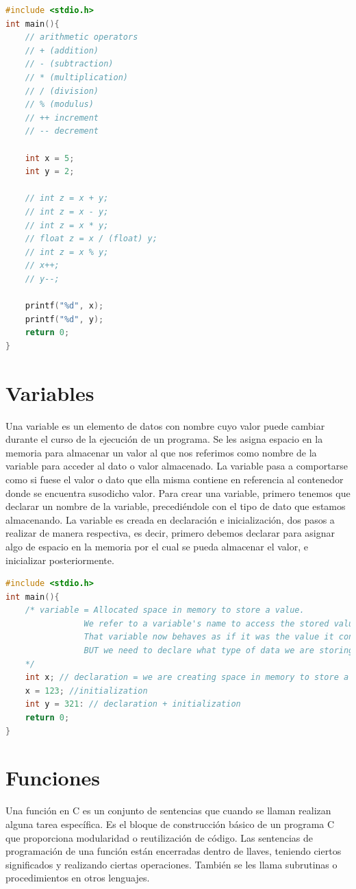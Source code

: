 \documentclass{article}
\begin{document}
\begin{lstlisting}[style=mystyle, language=C]
#include <stdio.h>
int main(){
	// arithmetic operators
	// + (addition)
	// - (subtraction)
	// * (multiplication)
	// / (division)
	// % (modulus)
	// ++ increment
	// -- decrement
	
	int x = 5;
	int y = 2;
	
	// int z = x + y;
	// int z = x - y;
	// int z = x * y;
	// float z = x / (float) y;
	// int z = x % y;
	// x++;
	// y--;
	
	printf("%d", x);
	printf("%d", y);
	return 0;
}
\end{lstlisting}
\section{Variables}
Una variable es un elemento de datos con nombre cuyo valor puede cambiar durante el curso de la ejecución de un programa. Se les asigna espacio en la memoria para almacenar un valor al que nos referimos como nombre de la variable para acceder al dato o valor almacenado. La variable pasa a comportarse como si fuese el valor o dato que ella misma contiene en referencia al contenedor donde se encuentra susodicho valor. Para crear una variable, primero tenemos que declarar un nombre de la variable, precediéndole con el tipo de dato que estamos almacenando. La variable es creada en declaración e inicialización, dos pasos a realizar de manera respectiva, es decir, primero debemos declarar para asignar algo de espacio en la memoria por el cual se pueda almacenar el valor, e inicializar posteriormente.

\begin{lstlisting}[style=mystyle, language=C]
#include <stdio.h>
int main(){
	/* variable = Allocated space in memory to store a value.
				We refer to a variable's name to access the stored value.
				That variable now behaves as if it was the value it contains.
				BUT we need to declare what type of data we are storing.
	*/
	int x; // declaration = we are creating space in memory to store a value
	x = 123; //initialization
	int y = 321: // declaration + initialization
	return 0;
}
\end{lstlisting}

\section{Funciones}
Una función en C es un conjunto de sentencias que cuando se llaman realizan alguna tarea específica. Es el bloque de construcción básico de un programa C que proporciona modularidad o reutilización de código. Las sentencias de programación de una función están encerradas dentro de { } llaves, teniendo ciertos significados y realizando ciertas operaciones. También se les llama subrutinas o procedimientos en otros lenguajes.
\end{document}
